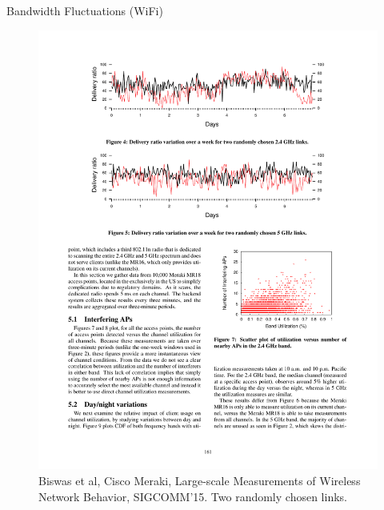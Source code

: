 \begin{frame}{Bandwidth Fluctuations (WiFi)}
  \begin{figure}
    \includegraphics[width=\textwidth]{figures/bandwidth-wifi.pdf}
    \caption{Biswas et al, Cisco Meraki, Large-scale Measurements of Wireless
      Network Behavior, SIGCOMM'15. Two randomly chosen links.}
  \end{figure}
\end{frame}

